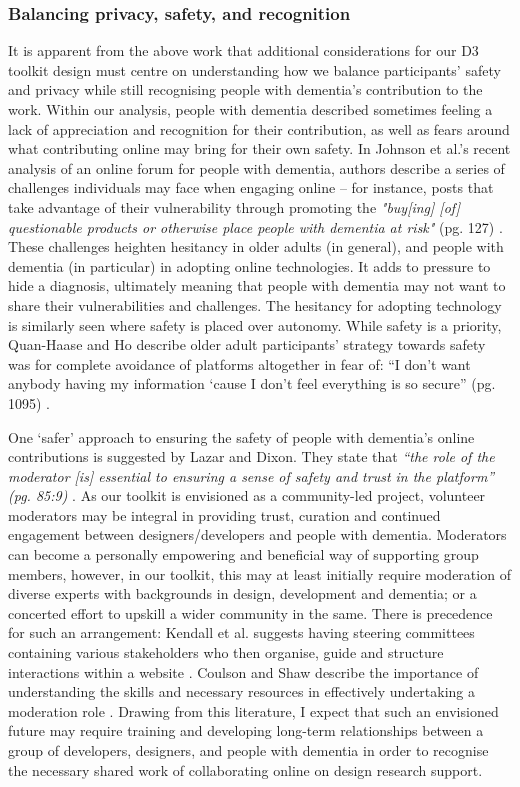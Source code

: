 \subsubsection{Balancing privacy, safety, and recognition}
It is apparent from the above work that additional considerations for our D3 toolkit design must centre on understanding how we balance participants’ safety and privacy while still recognising people with dementia's contribution to the work. Within our analysis, people with dementia described sometimes feeling a lack of appreciation and recognition for their contribution, as well as fears around what contributing online may bring for their own safety. In Johnson et al.’s recent analysis of an online forum for people with dementia, authors describe a series of challenges individuals may face when engaging online – for instance, posts that take advantage of their vulnerability through promoting the \textit{"buy[ing] [of] questionable products or otherwise place people with dementia at risk"} (pg. 127) \citep{johnson2020roles}. These challenges heighten hesitancy in older adults (in general), and people with dementia (in particular) in adopting online technologies. It adds to pressure to hide a diagnosis, ultimately meaning that people with dementia may not want to share their vulnerabilities and challenges. The hesitancy for adopting technology is similarly seen where safety is placed over autonomy. While safety is a priority, Quan-Haase and Ho describe older adult participants’ strategy towards safety was for complete avoidance of platforms altogether in fear of: “I don’t want anybody having my information ‘cause I don’t feel everything is so secure” (pg. 1095) \citep{quan2020online}.

One ‘safer’ approach to ensuring the safety of people with dementia’s online contributions is suggested by Lazar and Dixon. They state that \textit{“the role of the moderator [is] essential to ensuring a sense of safety and trust in the platform” (pg. 85:9) }\citep{lazar_safe_2019}. As our toolkit is envisioned as a community-led project, volunteer moderators may be integral in providing trust, curation and continued engagement between designers/developers and people with dementia. Moderators can become a personally empowering and beneficial way of supporting group members, however, in our toolkit, this may at least initially require moderation of diverse experts with backgrounds in design, development and dementia; or a concerted effort to upskill a wider community in the same. There is precedence for such an arrangement: Kendall et al. suggests having steering committees containing various stakeholders who then organise, guide and structure interactions within a website \citep{kendall2008collaborative}. Coulson and Shaw describe the importance of understanding the skills and necessary resources in effectively undertaking a moderation role \citep{coulson2013nurturing}. Drawing from this literature, I expect that such an envisioned future may require training and developing long-term relationships between a group of developers, designers, and people with dementia in order to recognise the necessary shared work of collaborating online on design research support.

